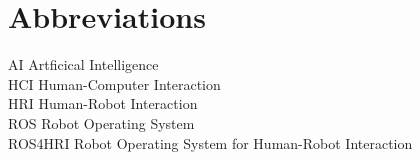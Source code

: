 
\chapter*{Abbreviations}

\begin{flushleft}

AI \hfill  Artficical Intelligence \\
HCI \hfill  Human-Computer Interaction \\
HRI \hfill  Human-Robot Interaction \\
ROS \hfill  Robot Operating System \\
ROS4HRI \hfill  Robot Operating System for Human-Robot Interaction \\


\end{flushleft}
